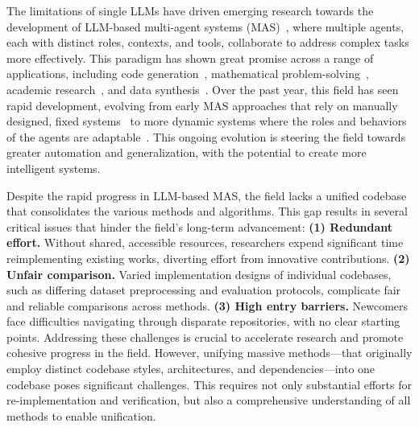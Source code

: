 \documentclass{article}
\begin{document}
The limitations of single LLMs have driven emerging research towards the development of LLM-based multi-agent systems (MAS)~\cite{qian2024chatdev,li2023camel,adas,masgpt}, where multiple agents, each with distinct roles, contexts, and tools, collaborate to address complex tasks more effectively.
This paradigm has shown great promise across a range of applications, including code generation~\cite{qian2024chatdev,hongmetagpt}, mathematical problem-solving~\cite{leimacm,mathprompter}, academic research~\cite{aiscientists,agentlab}, and data synthesis~\cite{matrix,matrix2}.
Over the past year, this field has seen rapid development, evolving from early MAS approaches that rely on manually designed, fixed systems~\cite{qian2024chatdev,debate1,hongmetagpt,debate2,chen2023agentverse,leimacm} to more dynamic systems where the roles and behaviors of the agents are adaptable~\cite{adas,masgpt,aflow,dylan,zhugegptswarm}.
This ongoing evolution is steering the field towards greater automation and generalization, with the potential to create more intelligent systems.

Despite the rapid progress in LLM-based MAS, the field lacks a unified codebase that consolidates the various methods and algorithms.
This gap results in several critical issues that hinder the field's long-term advancement:
\textbf{(1) Redundant effort.} Without shared, accessible resources, researchers expend significant time reimplementing existing works, diverting effort from innovative contributions.
\textbf{(2) Unfair comparison.} Varied implementation designs of individual codebases, such as differing dataset preprocessing and evaluation protocols, complicate fair and reliable comparisons across methods.
\textbf{(3) High entry barriers.} Newcomers face difficulties navigating through disparate repositories, with no clear starting points.
Addressing these challenges is crucial to accelerate research and promote cohesive progress in the field.
However, unifying massive methods—that originally employ distinct codebase styles, architectures, and dependencies—into one codebase poses significant challenges.
This requires not only substantial efforts for re-implementation and verification, but also a comprehensive understanding of all methods to enable unification.
\end{document}

